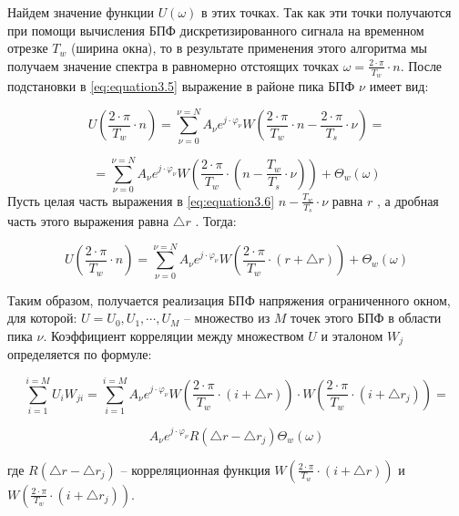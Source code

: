 Найдем значение функции $U(\omega)$  в этих точках. Так как эти точки получаются при помощи вычисления БПФ дискретизированного сигнала на временном отрезке $T_w$ (ширина окна), то в результате применения этого алгоритма мы получаем значение спектра в равномерно отстоящих точках $ \omega = \frac{2 \cdot \pi}{T_w} \cdot n$. После подстановки   в \ref{eq:equation3.5} выражение в районе пика БПФ $\nu$ имеет вид:

\begin{equation}
	\label{eq:equation3.6}
	U \left(\frac{2 \cdot \pi}{T_w} \cdot n \right) = \displaystyle\sum_{\nu=0}^{\nu=N} A_{\nu} e^{j \cdot \varphi_\nu} W\left( {\frac{2 \cdot \pi}{T_w} \cdot n - \frac{2 \cdot \pi}{T_s} \cdot \nu }\right) = 
\end{equation}

$$
=  \displaystyle\sum_{\nu=0}^{\nu=N} A_{\nu} e^{j \cdot \varphi_\nu} W \left({\frac{2 \cdot \pi}{T_w} \cdot \left( {n - \frac{T_w}{T_s} \cdot \nu} \right) } \right) + \Theta_w(\omega)
$$
Пусть целая часть выражения в \ref{eq:equation3.6} $ n - \frac{T_w}{T_s} \cdot \nu$  равна $r$ , а дробная часть этого выражения равна $ \bigtriangleup r$ . Тогда: 

\begin{equation}
	\label{eq:equation3.7}
	U \left(\frac{2 \cdot \pi}{T_w} \cdot n \right) = \displaystyle\sum_{\nu=0}^{\nu=N} A_{\nu} e^{j \cdot \varphi_\nu} W\left( {\frac{2 \cdot \pi}{T_w} \cdot (r + \bigtriangleup r ) }\right) + \Theta_w(\omega)
\end{equation}

Таким образом, получается реализация БПФ напряжения ограниченного окном, для которой: $U = {U_0, U_1, \cdots , U_M} $ – множество из $M$ точек этого БПФ в области пика $\nu$.
Коэффициент корреляции между множеством $U$ и эталоном $W_j$ определяется по формуле:

\begin{equation}
	\label{eq:equation3.8}
	\displaystyle\sum_{i=1}^{i=M} U_i W_{ji} = \displaystyle\sum_{i=1}^{i=M} A_{\nu} e^{j \cdot \varphi_\nu} W\left( {\frac{2 \cdot \pi}{T_w} \cdot (i + \bigtriangleup r ) }\right) \cdot W\left( {\frac{2 \cdot \pi}{T_w} \cdot (i + \bigtriangleup r_j ) }\right) =
\end{equation}

$$
A_{\nu} e^{j \cdot \varphi_\nu} R (\bigtriangleup r - \bigtriangleup r_j) \Theta_w(\omega)
$$

где $R (\bigtriangleup r - \bigtriangleup r_j)$ – корреляционная функция $W\left( {\frac{2 \cdot \pi}{T_w} \cdot (i + \bigtriangleup r) }\right)$  и $W\left( {\frac{2 \cdot \pi}{T_w} \cdot (i + \bigtriangleup r_j) }\right)$. 

